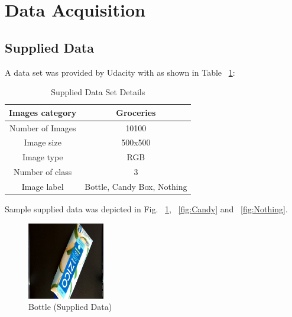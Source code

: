 \documentclass[10pt,journal,compsoc]{IEEEtran}
\begin{document}



\section{Data Acquisition}
\subsection{Supplied Data}

A data set was provided by Udacity with as shown in Table ~\ref{supplied data set details}:
\begin{table}[h]
\caption{Supplied Data Set Details}
\label{supplied data set details}
\begin{center}
\begin{tabular}{|c||c|}
\hline
Images category & Groceries\\
\hline
Number of Images & 10100\\
\hline
Image size & 500x500\\
\hline
Image type & RGB\\
\hline
Number of class & 3\\
\hline
Image label & Bottle, Candy Box, Nothing\\
\hline
\end{tabular}
\end{center}
\end{table}

Sample supplied data was depicted in Fig. ~\ref{fig:Bottle}, ~\ref{fig:Candy} and ~\ref{fig:Nothing}.
\begin{figure}[!htbp]
      \centering
      \includegraphics[width=0.3\textwidth]{coconut}
      \caption{Bottle (Supplied Data)}
      \label{fig:Bottle}
\end{figure}
\end{document}
